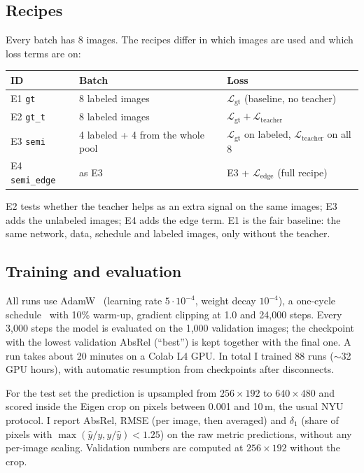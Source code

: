\documentclass[11pt]{article}
\begin{document}
\subsection{Recipes}

Every batch has 8 images. The recipes differ in which images are used and which loss terms are
on:

\begin{center}\small
\begin{tabular}{@{}lll@{}}
\toprule
ID & Batch & Loss \\
\midrule
E1 \texttt{gt} & 8 labeled images & $\mathcal{L}_{\text{gt}}$ (baseline, no teacher) \\
E2 \texttt{gt\_t} & 8 labeled images & $\mathcal{L}_{\text{gt}} + \mathcal{L}_{\text{teacher}}$ \\
E3 \texttt{semi} & 4 labeled + 4 from the whole pool & $\mathcal{L}_{\text{gt}}$ on labeled, $\mathcal{L}_{\text{teacher}}$ on all 8 \\
E4 \texttt{semi\_edge} & as E3 & E3 + $\mathcal{L}_{\text{edge}}$ (full recipe) \\
\bottomrule
\end{tabular}
\end{center}

E2 tests whether the teacher helps as an extra signal on the same images; E3 adds the unlabeled
images; E4 adds the edge term. E1 is the fair baseline: the same network, data, schedule and
labeled images, only without the teacher.

\subsection{Training and evaluation}

All runs use AdamW~\cite{loshchilov2019} (learning rate $5\cdot10^{-4}$, weight decay $10^{-4}$),
a one-cycle schedule~\cite{smith2019} with 10\% warm-up, gradient clipping at 1.0 and
24,000 steps. Every 3,000 steps the model is evaluated on the 1,000 validation images; the
checkpoint with the lowest validation AbsRel (``best'') is kept together with the final one.
A run takes about 20 minutes on a Colab L4 GPU. In total I trained 88 runs ($\sim$32 GPU hours),
with automatic resumption from checkpoints after disconnects.

For the test set the prediction is upsampled from $256\times192$ to $640\times480$ and scored
inside the Eigen crop on pixels between 0.001 and 10\,m, the usual NYU protocol. I report
AbsRel, RMSE (per image, then averaged) and $\delta_1$ (share of pixels with
$\max(\hat{y}/y, y/\hat{y}) < 1.25$) on the raw metric predictions, without any per-image
scaling. Validation numbers are computed at $256\times192$ without the crop.
\end{document}
